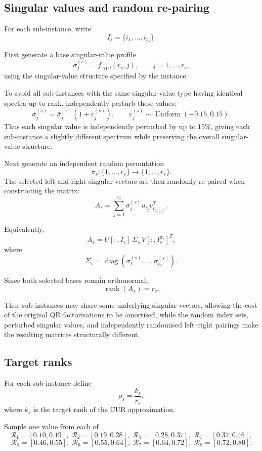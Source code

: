 \documentclass[12pt, legalpaper]{article}
\begin{document}
\subsection{Singular values and random re-pairing}

For each sub-instance, write
\[
I_s=\{i_1,\ldots,i_{r_s}\}.
\]

First generate a base singular-value profile
\[
\bar{\sigma}^{(s)}_j
=
f_{\mathrm{type}}(r_s,j),
\qquad j=1,\ldots,r_s,
\]
using the singular-value structure specified by the instance.

To avoid all sub-instances with the same singular-value type having
identical spectra up to rank, independently perturb these values:
\[
\sigma^{(s)}_j
=
\bar{\sigma}^{(s)}_j
\left(1+\varepsilon^{(s)}_j\right),
\qquad
\varepsilon^{(s)}_j
\sim
\operatorname{Uniform}(-0.15,0.15).
\]
Thus each singular value is independently perturbed by up to $15\%$,
giving each sub-instance a slightly different spectrum while preserving
the overall singular-value structure.

Next generate an independent random permutation
\[
\pi_s:\{1,\ldots,r_s\}\rightarrow\{1,\ldots,r_s\}.
\]
The selected left and right singular vectors are then randomly re-paired
when constructing the matrix:
\[
A_s
=
\sum_{j=1}^{r_s}
\sigma^{(s)}_j
u_{i_j}
v_{i_{\pi_s(j)}}^T.
\]

Equivalently,
\[
A_s
=
U[:,I_s]\,
\Sigma_s\,
V[:,I_s^{\pi_s}]^T,
\]
where
\[
\Sigma_s
=
\operatorname{diag}
\left(
\sigma^{(s)}_1,\ldots,\sigma^{(s)}_{r_s}
\right).
\]

Since both selected bases remain orthonormal,
\[
\operatorname{rank}(A_s)=r_s.
\]

Thus sub-instances may share some underlying singular vectors, allowing the
cost of the original QR factorisations to be amortised, while the random
index sets, perturbed singular values, and independently randomised
left--right pairings make the resulting matrices structurally different.

\subsection{Target ranks}

For each sub-instance define
\[
\rho_s=\frac{k_s}{r_s},
\]
where $k_s$ is the target rank of the CUR approximation.

Sample one value from each of
\[
\mathcal R_1=[0.10,0.19],\;
\mathcal R_2=[0.19,0.28],\;
\mathcal R_3=[0.28,0.37],\;
\mathcal R_4=[0.37,0.46],
\]
\[
\mathcal R_5=[0.46,0.55],\;
\mathcal R_6=[0.55,0.64],\;
\mathcal R_7=[0.64,0.72],\;
\mathcal R_8=[0.72,0.80].
\]
\end{document}
